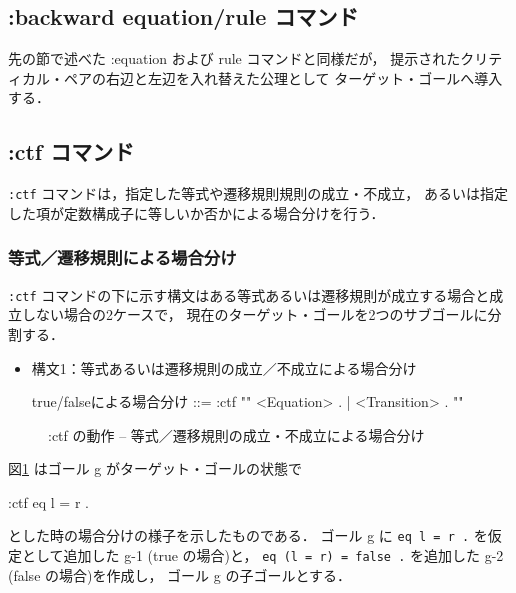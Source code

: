 \documentclass[a4paper,oneside,10pt,here]{memoir}
\newenvironment{vvtm}%
{\parskip=0pt\lineskip=0pt\begin{center}\begin{minipage}{0.8\textwidth}\begin{snugshade}}%
  {\end{snugshade}\end{minipage}\end{center}}
\begin{document}
\subsection{:backward equation/rule コマンド}
先の節で述べた :equation および rule コマンドと同様だが，
提示されたクリティカル・ペアの右辺と左辺を入れ替えた公理として
ターゲット・ゴールへ導入する．

\subsection{:ctf コマンド}\label{sec:ctf}
\texttt{:ctf} コマンドは，指定した等式や遷移規則規則の成立・不成立，
あるいは指定した項が定数構成子に等しいか否かによる場合分けを行う．

\subsubsection{等式／遷移規則による場合分け}
\texttt{:ctf} コマンドの下に示す構文はある等式あるいは遷移規則が成立する場合と成立しない場合の2ケースで，
現在のターゲット・ゴールを2つのサブゴールに分割する．
\begin{itemize}
\item 構文1：等式あるいは遷移規則の成立／不成立による場合分け
  \begin{vvtm}
    \begin{simplev}
      true/falseによる場合分け ::= :ctf "{" { <Equation> . | <Transition> . } "}"
    \end{simplev}
  \end{vvtm}
\end{itemize}

\begin{figure}[hbt]
  \centering
  
  \caption{:ctf の動作 -- 等式／遷移規則の成立・不成立による場合分け}
  \label{fig:ctf}
\end{figure}
図\ref{fig:ctf} はゴール g がターゲット・ゴールの状態で
  \begin{simplev}
    :ctf {eq l = r . }
  \end{simplev}
とした時の場合分けの様子を示したものである．
ゴール g に \texttt{eq l = r .} を仮定として追加した g-1 (true の場合)と，
  \texttt{eq (l = r) = false .} を追加した g-2 (false の場合)を作成し，
  ゴール g の子ゴールとする．
\end{document}
